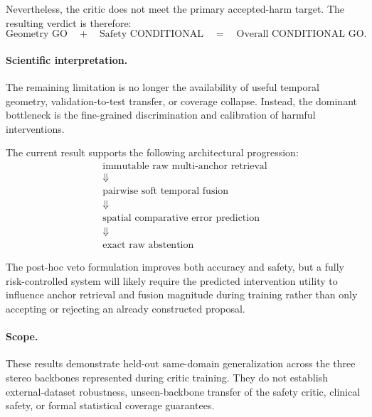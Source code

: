 \documentclass[11pt,a4paper]{article}
\begin{document}
Nevertheless, the critic does not meet the primary accepted-harm target.
The resulting verdict is therefore:
\begin{equation}
    \boxed{
        \text{Geometry GO}
        \quad+\quad
        \text{Safety CONDITIONAL}
        \quad=\quad
        \text{Overall CONDITIONAL GO}
    }.
\end{equation}

\paragraph{Scientific interpretation.}

The remaining limitation is no longer the availability of useful temporal
geometry, validation-to-test transfer, or coverage collapse. Instead, the
dominant bottleneck is the fine-grained discrimination and calibration of
harmful interventions.

The current result supports the following architectural progression:
\begin{equation}
    \boxed{
    \begin{array}{c}
        \text{immutable raw multi-anchor retrieval}\\
        \Downarrow\\
        \text{pairwise soft temporal fusion}\\
        \Downarrow\\
        \text{spatial comparative error prediction}\\
        \Downarrow\\
        \text{exact raw abstention}
    \end{array}}
\end{equation}

The post-hoc veto formulation improves both accuracy and safety, but a fully
risk-controlled system will likely require the predicted intervention utility
to influence anchor retrieval and fusion magnitude during training rather than
only accepting or rejecting an already constructed proposal.

\paragraph{Scope.}

These results demonstrate held-out same-domain generalization across the three
stereo backbones represented during critic training. They do not establish
external-dataset robustness, unseen-backbone transfer of the safety critic,
clinical safety, or formal statistical coverage guarantees.
\end{document}
